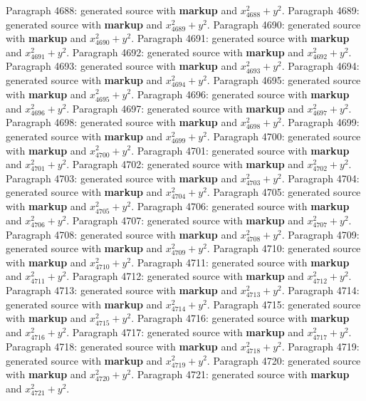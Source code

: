 \documentclass{article}
\begin{document}
Paragraph 4688: generated source with \textbf{markup} and $x_{4688}^2 + y^2$.
Paragraph 4689: generated source with \textbf{markup} and $x_{4689}^2 + y^2$.
Paragraph 4690: generated source with \textbf{markup} and $x_{4690}^2 + y^2$.
Paragraph 4691: generated source with \textbf{markup} and $x_{4691}^2 + y^2$.
Paragraph 4692: generated source with \textbf{markup} and $x_{4692}^2 + y^2$.
Paragraph 4693: generated source with \textbf{markup} and $x_{4693}^2 + y^2$.
Paragraph 4694: generated source with \textbf{markup} and $x_{4694}^2 + y^2$.
Paragraph 4695: generated source with \textbf{markup} and $x_{4695}^2 + y^2$.
Paragraph 4696: generated source with \textbf{markup} and $x_{4696}^2 + y^2$.
Paragraph 4697: generated source with \textbf{markup} and $x_{4697}^2 + y^2$.
Paragraph 4698: generated source with \textbf{markup} and $x_{4698}^2 + y^2$.
Paragraph 4699: generated source with \textbf{markup} and $x_{4699}^2 + y^2$.
Paragraph 4700: generated source with \textbf{markup} and $x_{4700}^2 + y^2$.
Paragraph 4701: generated source with \textbf{markup} and $x_{4701}^2 + y^2$.
Paragraph 4702: generated source with \textbf{markup} and $x_{4702}^2 + y^2$.
Paragraph 4703: generated source with \textbf{markup} and $x_{4703}^2 + y^2$.
Paragraph 4704: generated source with \textbf{markup} and $x_{4704}^2 + y^2$.
Paragraph 4705: generated source with \textbf{markup} and $x_{4705}^2 + y^2$.
Paragraph 4706: generated source with \textbf{markup} and $x_{4706}^2 + y^2$.
Paragraph 4707: generated source with \textbf{markup} and $x_{4707}^2 + y^2$.
Paragraph 4708: generated source with \textbf{markup} and $x_{4708}^2 + y^2$.
Paragraph 4709: generated source with \textbf{markup} and $x_{4709}^2 + y^2$.
Paragraph 4710: generated source with \textbf{markup} and $x_{4710}^2 + y^2$.
Paragraph 4711: generated source with \textbf{markup} and $x_{4711}^2 + y^2$.
Paragraph 4712: generated source with \textbf{markup} and $x_{4712}^2 + y^2$.
Paragraph 4713: generated source with \textbf{markup} and $x_{4713}^2 + y^2$.
Paragraph 4714: generated source with \textbf{markup} and $x_{4714}^2 + y^2$.
Paragraph 4715: generated source with \textbf{markup} and $x_{4715}^2 + y^2$.
Paragraph 4716: generated source with \textbf{markup} and $x_{4716}^2 + y^2$.
Paragraph 4717: generated source with \textbf{markup} and $x_{4717}^2 + y^2$.
Paragraph 4718: generated source with \textbf{markup} and $x_{4718}^2 + y^2$.
Paragraph 4719: generated source with \textbf{markup} and $x_{4719}^2 + y^2$.
Paragraph 4720: generated source with \textbf{markup} and $x_{4720}^2 + y^2$.
Paragraph 4721: generated source with \textbf{markup} and $x_{4721}^2 + y^2$.
\end{document}
